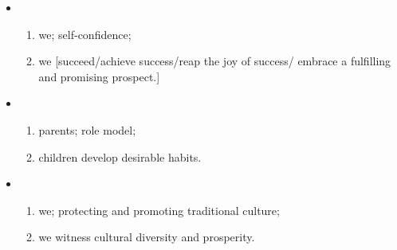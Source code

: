 \begin{itemize}
    \item \begin{enumerate}
        \item we; self-confidence;
        \item we [succeed/achieve success/reap the joy of success/
        embrace a fulfilling and promising prospect.]
    \end{enumerate}
    \item \begin{enumerate}
        \item parents; role model;
        \item children develop desirable habits.
    \end{enumerate}
    \item \begin{enumerate}
        \item we; protecting and promoting traditional culture;
        \item we witness cultural diversity and prosperity.
    \end{enumerate}
\end{itemize}

